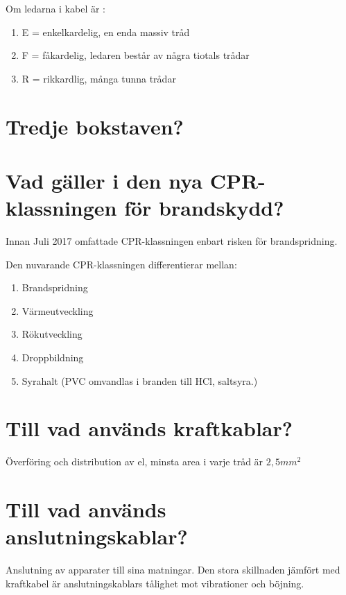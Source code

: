 \documentclass[a4paper,swedish]{article}
\begin{document}
Om ledarna i kabel är :
\begin{enumerate}
\item E = enkelkardelig, en enda massiv tråd
\item F = fåkardelig, ledaren består av några tiotals trådar
\item R = rikkardlig, många tunna trådar
\end{enumerate}

\setcounter{section}{18}
\section{Tredje bokstaven?}

\setcounter{section}{20}
\section{Vad gäller i den nya CPR-klassningen för brandskydd?}

Innan Juli 2017 omfattade CPR-klassningen enbart risken för brandspridning.

Den nuvarande CPR-klassningen differentierar mellan:

\begin{center}
  \begin{enumerate}
  \item Brandspridning
  \item Värmeutveckling
  \item Rökutveckling
  \item Droppbildning
  \item Syrahalt (PVC omvandlas i branden till HCl, saltsyra.)
  \end{enumerate}
\end{center}

\setcounter{section}{22}
\section{Till vad används kraftkablar?}

Överföring och distribution av el, minsta area i varje tråd är $2,5 mm^2$

\setcounter{section}{24}
\section{Till vad används anslutningskablar?}

Anslutning av apparater till sina matningar. Den stora skillnaden jämfört med kraftkabel är anslutningskablars
tålighet mot vibrationer och böjning.
\end{document}
